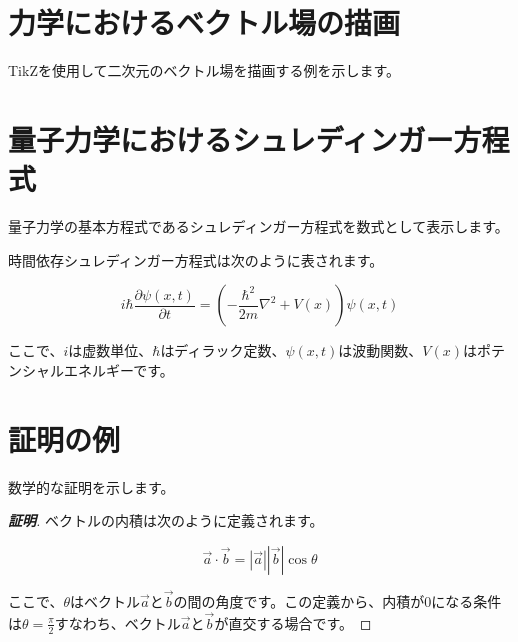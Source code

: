 \documentclass[
  11pt,
  pandoc,
  a4paper,
  pdflatex,
  japaram={jis2004}]{bxjsarticle}
\let\origfigure\figure
\let\endorigfigure\endfigure
\renewenvironment{figure}[1][2] {
    \expandafter\origfigure\expandafter[H]
} {
    \endorigfigure
}
\begin{document}
\section{力学におけるベクトル場の描画}\label{ux529bux5b66ux306bux304aux3051ux308bux30d9ux30afux30c8ux30ebux5834ux306eux63cfux753b}

TikZを使用して二次元のベクトル場を描画する例を示します。

\begin{figure}
\centering
{}
\end{figure}

\section{量子力学におけるシュレディンガー方程式}\label{ux91cfux5b50ux529bux5b66ux306bux304aux3051ux308bux30b7ux30e5ux30ecux30c7ux30a3ux30f3ux30acux30fcux65b9ux7a0bux5f0f}

量子力学の基本方程式であるシュレディンガー方程式を数式として表示します。

\begin{tcolorbox}

時間依存シュレディンガー方程式は次のように表されます。

\[
i\hbar \frac{\partial \psi(x,t)}{\partial t} = \left( -\frac{\hbar^2}{2m} \nabla^2 + V(x) \right) \psi(x,t)
\]

ここで、\(i\)は虚数単位、\(\hbar\)はディラック定数、\(\psi(x,t)\)は波動関数、\(V(x)\)はポテンシャルエネルギーです。

\end{tcolorbox}

\section{証明の例}\label{ux8a3cux660eux306eux4f8b}

数学的な証明を示します。

\begin{proof}[\textbf{証明}]

ベクトルの内積は次のように定義されます。

\[
\vec{a} \cdot \vec{b} = |\vec{a}| |\vec{b}| \cos\theta
\]

ここで、\(\theta\)はベクトル\(\vec{a}\)と\(\vec{b}\)の間の角度です。この定義から、内積が0になる条件は\(\theta = \frac{\pi}{2}\)すなわち、ベクトル\(\vec{a}\)と\(\vec{b}\)が直交する場合です。

\end{proof}
\end{document}
